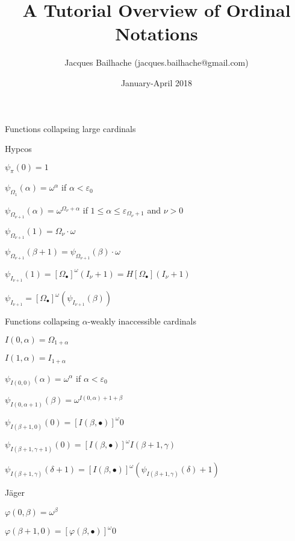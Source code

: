 \documentclass[10pt]{article}
\begin{document}
\title{A Tutorial Overview of Ordinal Notations}
\author{Jacques Bailhache (jacques.bailhache@gmail.com)}
\date{January-April 2018}

\maketitle

\setlength{\parindent}{0pt}

Functions collapsing large cardinals

\bigskip

Hypcos

\( \psi_\pi(0) = 1 \)

\( \psi_{\Omega_1}(\alpha) = \omega^\alpha \) if \( \alpha < \varepsilon_0 \)

\( \psi_{\Omega_{\nu+1}}(\alpha) = \omega^{\Omega_\nu+\alpha} \) if \( 1 \le \alpha \le \varepsilon_{\Omega_\nu+1} \) and \( \nu > 0 \)

\( \psi_{\Omega_{\nu+1}}(1) = \Omega_\nu \cdot \omega \)

\( \psi_{\Omega_{\nu+1}}(\beta+1) = \psi_{\Omega_{\nu+1}}(\beta) \cdot \omega \)

\( \psi_{I_{\nu+1}}(1) = [\Omega_\bullet]^\omega(I_\nu+1) = H [\Omega_\bullet] (I_\nu+1) \)

\( \psi_{I_{\nu+1}} = [\Omega_\bullet]^\omega (\psi_{I_{\nu+1}}(\beta)) \)

\bigskip

Functions collapsing \(\alpha\)-weakly inaccessible cardinals 

\( I(0,\alpha) = \Omega_{1+\alpha} \)

\( I(1,\alpha) = I_{1+\alpha} \)

\( \psi_{I(0,0)}(\alpha) = \omega^\alpha \) if \( \alpha < \varepsilon_0 \)

\( \psi_{I(0,\alpha+1)}(\beta) = \omega^{I(0,\alpha)+1+\beta} \)

\( \psi_{I(\beta+1,0)}(0) = [I(\beta,\bullet)]^\omega 0 \)

\( \psi_{I(\beta+1,\gamma+1)}(0) = [I(\beta,\bullet)]^\omega I(\beta+1,\gamma) \)

\( \psi_{I(\beta+1,\gamma)}(\delta+1) = [I(\beta,\bullet)]^\omega (\psi_{I(\beta+1,\gamma)}(\delta)+1) \)

\bigskip

Jäger

\( \varphi(0,\beta) = \omega^\beta \)

\( \varphi(\beta+1,0) = [\varphi(\beta,\bullet)]^\omega 0 \)
\end{document}
